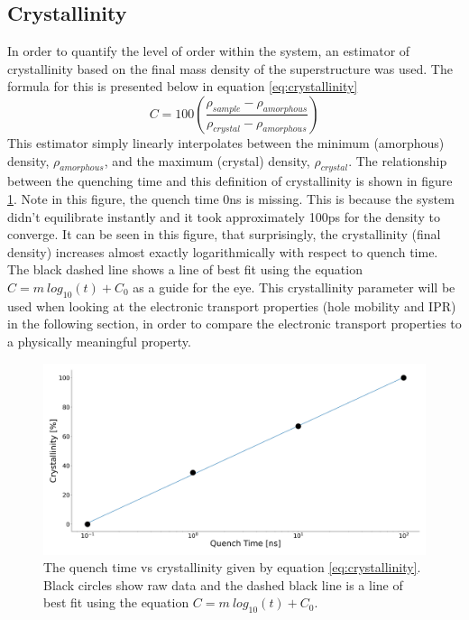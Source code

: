 \subsection{Crystallinity}
In order to quantify the level of order within the system, an estimator of crystallinity based on the final mass density of the superstructure was used. The formula for this is presented below in equation \eqref{eq:crystallinity}
\begin{equation}
  C = 100 \left(\frac{\rho_{sample} - \rho_{amorphous}}{\rho_{crystal} - \rho_{amorphous}}\right)
  \label{eq:crystallinity}
\end{equation}
This estimator simply linearly interpolates between the minimum (amorphous) density, $\rho_{amorphous}$, and the maximum (crystal) density, $\rho_{crystal}$. The relationship between the quenching time and this definition of crystallinity is shown in figure \ref{fig:crystallinity}. Note in this figure, the quench time 0ns is missing. This is because the system didn't equilibrate instantly and it took approximately 100ps for the density to converge. It can be seen in this figure, that surprisingly, the crystallinity (final density) increases almost exactly logarithmically with respect to quench time. The black dashed line shows a line of best fit using the equation $C = m \ log_{10}(t) + C_{0}$ as a guide for the eye. This crystallinity parameter will be used when looking at the electronic transport properties (hole mobility and IPR) in the following section, in order to compare the electronic transport properties to a physically meaningful property.
\begin{figure}[htp]
  \includegraphics[width=\textwidth]{../img/DifferentQuenchTimes/QuenchTvsCrystallinity.png}
  \caption{\label{fig:crystallinity}The quench time vs crystallinity given by equation \ref{eq:crystallinity}. Black circles show raw data and the dashed black line is a line of best fit using the equation $C = m \ log_{10}(t) + C_{0}$.}
\end{figure}

